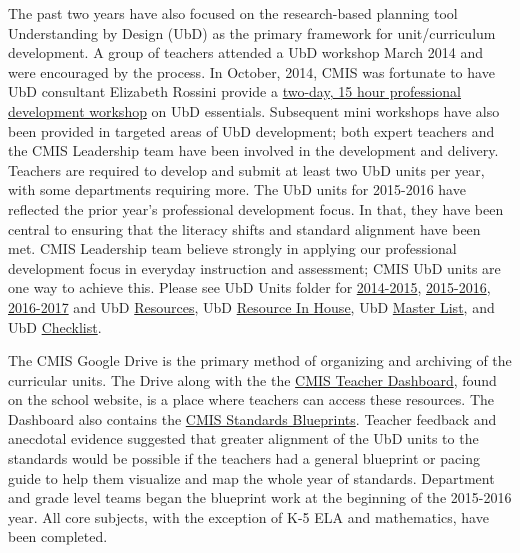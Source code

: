 \begin{findings}
The past two years have also focused on the research-based planning tool Understanding by Design (UbD) as the primary framework for unit/curriculum development. A group of teachers attended a UbD workshop March 2014 and were encouraged by the process. In October, 2014, CMIS was fortunate to have UbD consultant Elizabeth Rossini provide a \href{https://drive.google.com/drive/folders/0ByVFfrm0zfolbDlqWjhobkhDZkk?usp=sharing}{two-day, 15 hour professional development workshop} on UbD essentials. Subsequent mini workshops have also been provided in targeted areas of UbD development; both expert teachers and the CMIS Leadership team have been involved in the development and delivery. Teachers are required to develop and submit at least two UbD units per year, with some departments requiring more. The UbD units for 2015-2016 have reflected the prior year’s professional development focus. In that, they have been central to ensuring that the literacy shifts and standard alignment have been met. CMIS Leadership team believe strongly in applying our professional development focus in everyday instruction and assessment; CMIS UbD units are one way to achieve this. Please see UbD Units folder for \href{https://drive.google.com/drive/folders/0ByVFfrm0zfolQkFTQjNQMDhBN1E?usp=sharing}{2014-2015}, \href{https://drive.google.com/drive/folders/0ByVFfrm0zfolfl9RaFBtSy1YLVM2LUJONGNVcDAxbTZIWTNKTXVFZnh6eEUybjIwQi1RR3M?usp=sharing}{2015-2016}, \href{https://drive.google.com/drive/folders/0ByVFfrm0zfolak8xTjQ3NVhCbmc?usp=sharing}{2016-2017} and UbD \href{https://drive.google.com/a/cmis.ac.th/folderview?id=0ByVFfrm0zfolfmUyZV9DbGoxZVhpVHpGdG9MeEt6MHZJaEtoT3VzTjM0bkk5NFQ5MVJldUU&usp=sharing}{Resources}, UbD \href{https://drive.google.com/drive/folders/0ByVFfrm0zfolcXpjOUJTSmdIT1k?usp=sharing}{Resource In House}, UbD \href{https://docs.google.com/a/cmis.ac.th/document/d/1kL1VjwfuMMa7NaWmwUrEah1BM-jJRmLAd4VJzR3HoPs/edit?usp=sharing}{Master List}, and UbD \href{https://docs.google.com/a/cmis.ac.th/document/d/11IXUy-YcnFG8dMzr42iBigOuh1GmLVjcu_Ulv19r9Yg/edit?usp=sharing}{Checklist}. 

The CMIS Google Drive is the primary method of organizing and archiving  of the curricular units. The Drive along with the the \href{http://www.cmis.ac.th/}{CMIS Teacher Dashboard}, found on the school website, is a place where teachers can access these resources. The Dashboard also contains the \href{https://drive.google.com/drive/folders/0ByVFfrm0zfolfmV1QTNuWFdUVHV3dDVrRFMzUFBMazY0VGs1eWc0cmFjVGcwNDdsQkdrZzA?usp=sharing}{CMIS Standards Blueprints}. Teacher feedback and anecdotal evidence suggested that greater alignment of the UbD units to the standards would be possible if the teachers had a general blueprint or pacing guide to help them visualize and map the whole year of standards. Department and grade level teams began the blueprint work at the beginning of the 2015-2016 year. All core subjects, with the exception of K-5 ELA and mathematics, have been completed. 


\end{findings}
